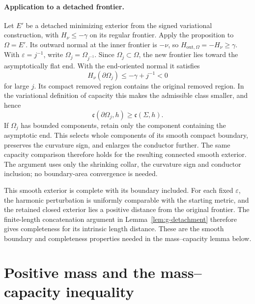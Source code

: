 \paragraph{Application to a detached frontier.}
Let $E'$ be a detached minimizing exterior from the signed
variational construction, with $H_\nu\le-\gamma$ on its regular
frontier. Apply the proposition to $\Omega=E'$.
Its outward normal at the inner frontier is $-\nu$, so
$H_{\mathrm{out},\Omega}=-H_\nu\ge\gamma$. With
$\varepsilon=j^{-1}$, write $\Omega_j=\Omega_{j^{-1}}$. Since
$\Omega_j\subset\Omega$, the new frontier lies toward the
asymptotically flat end. With the end-oriented normal it satisfies
\begin{equation}\label{eq:rpi:smoothing-sign}
 H_\nu(\partial\Omega_j)\le-\gamma+j^{-1}<0
\end{equation}
for large $j$. Its compact removed region contains the original
removed region. In the variational definition of capacity this makes
the admissible class smaller, and hence
\begin{equation}\label{eq:rpi:capacity-monotonicity}
 \mathfrak c(\partial\Omega_j,h)\ge\mathfrak c(\Sigma,h).
\end{equation}
If $\Omega_j$ has bounded components, retain only the component
containing the asymptotic end. This selects whole components of its
smooth compact boundary, preserves the curvature sign, and enlarges
the conductor further. The same capacity comparison therefore holds
for the resulting connected smooth exterior. The argument uses only
the shrinking collar, the curvature sign and conductor inclusion;
no boundary-area convergence is needed.

This smooth exterior is complete with its boundary included. For
each fixed $\varepsilon$, the harmonic perturbation is uniformly
comparable with the starting metric, and the retained closed
exterior lies a positive distance from the original frontier.
The finite-length concatenation argument in
Lemma~\ref{lem:g-detachment} therefore gives completeness for its
intrinsic length distance. These are the smooth boundary and
completeness properties needed in the mass--capacity lemma below.

\section{Positive mass and the mass--capacity inequality}
\label{sec:rpi:smooth-repair}

